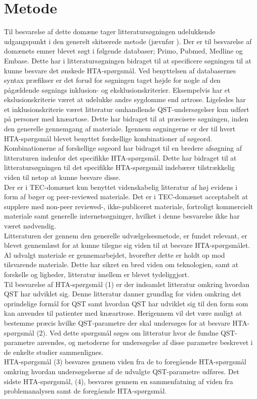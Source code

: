\section{Metode}
Til besvarelse af dette domæne tager litteratursøgningen udelukkende udgangspunkt i den generelt skitserede metode (jævnfør ). Der er til besvarelse af domænets emner blevet søgt i følgende databaser; Primo, Pubmed, Medline og Embase. Dette har i litteratursøgningen bidraget til at specificere søgningen til at kunne besvare det ønskede HTA-spørgsmål. Ved benyttelsen af databasernes syntax præfikser er det forud for søgningen taget højde for nogle af den pågældende søgnings inklusion- og eksklusionskriterier. Eksempelvis har et ekslusionskriterie været at udelukke andre sygdomme end artrose. Ligeledes har et inklusionskriterie været litteratur omhandlende QST-undersøgelser kun udført på personer med knæartose.  Dette har bidraget til at præcisere søgningen, inden den generelle gennemgang af materiale. Igennem søgningerne er der til hvert HTA-spørgsmål blevet benyttet forskellige kombinationer af søgeord. Kombinationerne af forskellige søgeord har bidraget til en bredere afsøgning af litteraturen indenfor det specifikke HTA-spørgsmål. Dette har bidraget til at litteratursøgningen til det specifikke HTA-spørgsmål indebærer tilstrækkelig viden til netop at kunne besvare disse. \\
Der er i TEC-domænet kun benyttet videnskabelig litteratur af høj evidens i form af bøger og peer-reviewed materiale. Det er i TEC-domænet acceptabelt at supplere med non-peer reviewed-, ikke-publiceret materiale, fortroligt kommercielt materiale samt generelle internetsøgninger, hvilket i denne besvarelse ikke har været nødvendig. \citep{HTAcore} \\
Litteraturen der gennem den generelle udvælgelsesmetode, er fundet relevant, er blevet gennemlæst for at kunne tilegne sig viden til at besvare HTA-spørgsmålet. Al udvalgt materiale er gennemarbejdet, hvorefter dette er holdt op mod tilsvarende materiale. Dette har sikret en bred viden om teknologien, samt at forskelle og ligheder, litteratur imellem er blevet tydeliggjort. \\
Til besvarelse af HTA-spørgsmål (1) er der indsamlet litteratur omkring hvordan QST har udviklet sig. Denne litteratur danner grundlag for viden omkring det oprindelige formål for QST samt hvordan QST har udviklet sig til den form som kan anvendes til patienter med knæartrose. Herigennem vil det være muligt at bestemme præcis hvilke QST-parametre der skal undersøges for at besvare HTA-spørgsmål (2). Ved dette spørgsmål søges om litteratur hvor de fundne QST-parametre anvendes, og metoderne for undersøgelse af disse parametre beskrevet i de enkelte studier sammenlignes. \\
HTA-spørgsmål (3) besvares gennem viden fra de to foregående HTA-spørgsmål omkring hvordan undersøgelserne af de udvalgte QST-parametre udføres. Det sidste HTA-spørgsmål, (4), besvares gennem en sammenfatning af viden fra problemanalysen samt de foregående HTA-spørgsmål.    
 
